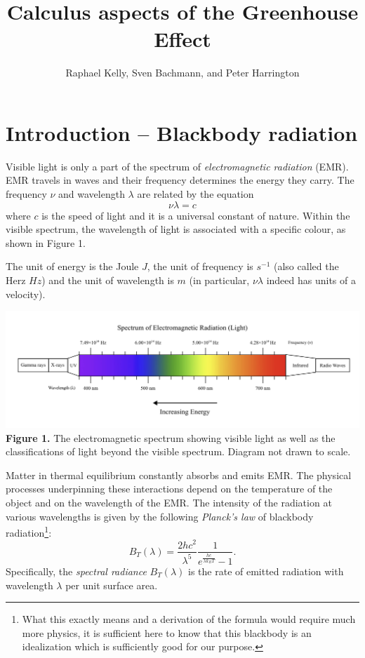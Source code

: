 \documentclass{exam}
\title{Calculus aspects of the Greenhouse Effect}
\date{}
\author{Raphael Kelly, Sven Bachmann, and Peter Harrington}
\begin{document}
\maketitle


\section*{Introduction -- Blackbody radiation}

\noindent Visible light is only a part of the spectrum of \emph{electromagnetic radiation} (EMR). EMR travels in waves and their frequency determines the energy they carry. The frequency $\nu$ and wavelength $\lambda$ are related by the equation \[\nu \lambda  = c\] where $c$ is the speed of light and it is a universal constant of nature. Within the visible spectrum, the wavelength of light is associated with a specific colour, as shown in Figure 1.

\noindent The unit of energy is the Joule $J$, the unit of frequency is $s^{-1}$ (also called the Herz $Hz$) and the unit of wavelength is $m$ (in particular, $\nu\lambda$ indeed has units of a velocity).

\begin{center}
    \includegraphics[scale=0.5]{spectrumofvisiblelight.png}
    \textbf{Figure 1.} The electromagnetic spectrum showing visible light as well as the classifications of light beyond the visible spectrum. Diagram not drawn to scale.
\end{center}

\noindent Matter in thermal equilibrium constantly absorbs and emits EMR. The physical processes underpinning these interactions depend on the temperature of the object and on the wavelength of the EMR. The intensity of the radiation at various wavelengths is given by the following \emph{Planck's law} of blackbody radiation\footnote{What this exactly means and a derivation of the formula would require much more physics, it is sufficient here to know that this blackbody is an idealization which is sufficiently good for our purpose.}:
$$B_T(\lambda) = \frac{2h c^2}{\lambda^5} \frac{1}{e^{\frac{h c}{\lambda k_B T}}-1}.$$
Specifically, the \emph{spectral radiance} $B_T(\lambda)$ is the rate of emitted radiation with wavelength $\lambda$ per unit surface area.
\end{document}
